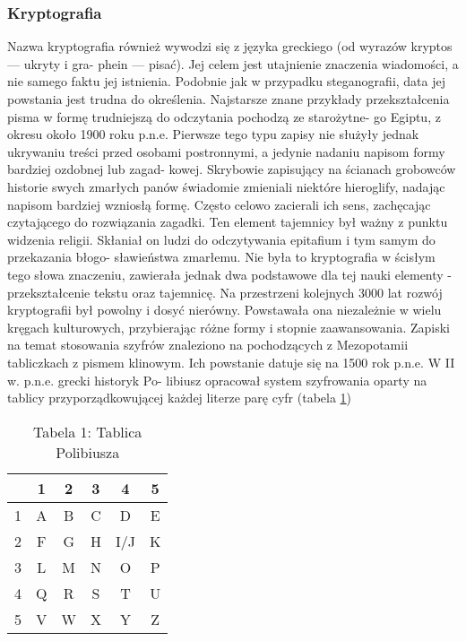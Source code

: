 \documentclass[a4paper]{article}
\begin{document}
\subsubsection{Kryptografia}
Nazwa kryptografia również wywodzi się z języka greckiego (od wyrazów kryptos — ukryty i gra-
phein — pisać). Jej celem jest utajnienie znaczenia wiadomości, a nie samego faktu jej istnienia.
Podobnie jak w przypadku steganografii, data jej powstania jest trudna do określenia. Najstarsze
znane przykłady przekształcenia pisma w formę trudniejszą do odczytania pochodzą ze starożytne-
go Egiptu, z okresu około 1900 roku p.n.e. Pierwsze tego typu zapisy nie służyły jednak ukrywaniu
treści przed osobami postronnymi, a jedynie nadaniu napisom formy bardziej ozdobnej lub zagad-
kowej. Skrybowie zapisujący na ścianach grobowców historie swych zmarłych panów świadomie
zmieniali niektóre hieroglify, nadając napisom bardziej wzniosłą formę. Często celowo zacierali ich
sens, zachęcając czytającego do rozwiązania zagadki. Ten element tajemnicy był ważny z punktu
widzenia religii. Skłaniał on ludzi do odczytywania epitafium i tym samym do przekazania błogo-
sławieństwa zmarłemu. Nie była to kryptografia w ścisłym tego słowa znaczeniu, zawierała jednak
dwa podstawowe dla tej nauki elementy - przekształcenie tekstu oraz tajemnicę.
Na przestrzeni kolejnych 3000 lat rozwój kryptografii był powolny i dosyć nierówny. Powstawała
ona niezależnie w wielu kręgach kulturowych, przybierając różne formy i stopnie zaawansowania.
Zapiski na temat stosowania szyfrów znaleziono na pochodzących z Mezopotamii tabliczkach z
pismem klinowym. Ich powstanie datuje się na 1500 rok p.n.e. W II w. p.n.e. grecki historyk Po-
libiusz opracował system szyfrowania oparty na tablicy przyporządkowującej każdej literze parę
cyfr (tabela \ref{tabela 1})

\begin{table}[h]
\centering\caption{Tabela 1: Tablica Polibiusza}\label{tabela 1}
\begin{tabular}{| c | c | c | c | c | c |}
\hline
 & 1 & 2 & 3 & 4 & 5\\ 
\hline
1 & A & B & C & D & E\\ 
\hline
2 & F & G & H & I/J & K\\ 
\hline	
3 & L & M & N & O & P\\ 
\hline
4 & Q & R & S & T & U\\ 
\hline
5 & V & W & X & Y & Z\\
\hline
\end{tabular}
\end{table}
\end{document}
